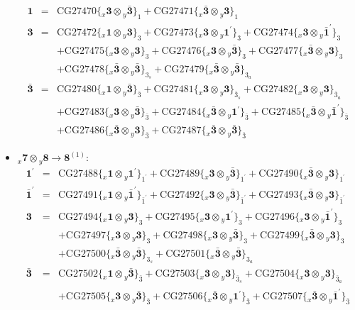 \documentclass[english]{article}
\newcommand{\rep}[1]{\mathbf{#1}}
\newcommand{\repx}[2]{{}_{#2}\mathbf{#1}}
\newcommand{\subcg}[3]{\big\{ \repx{#1}{x}\otimes\repx{#2}{y}\big\}^{}_{#3}}
\begin{document}
\begin{itemize}
\begin{eqnarray*}
\rep{1} &=& \text{CG27470}\subcg{3}{\bar{3}}{1}+\text{CG27471}\subcg{\bar{3}}{3}{1}
\\
\rep{3} &=& \text{CG27472}\subcg{1}{3}{3}+\text{CG27473}\subcg{3}{1^{\prime}}{3}+\text{CG27474}\subcg{3}{\bar{1}^{\prime}}{3} \\ 
 & & +\text{CG27475}\subcg{3}{3}{3}+\text{CG27476}\subcg{3}{\bar{3}}{3}+\text{CG27477}\subcg{\bar{3}}{3}{3} \\ 
 & & +\text{CG27478}\subcg{\bar{3}}{\bar{3}}{3_{s}}+\text{CG27479}\subcg{\bar{3}}{\bar{3}}{3_{a}}
\\
\rep{\bar{3}} &=& \text{CG27480}\subcg{1}{\bar{3}}{\bar{3}}+\text{CG27481}\subcg{3}{3}{\bar{3}_{s}}+\text{CG27482}\subcg{3}{3}{\bar{3}_{a}} \\ 
 & & +\text{CG27483}\subcg{3}{\bar{3}}{\bar{3}}+\text{CG27484}\subcg{\bar{3}}{1^{\prime}}{\bar{3}}+\text{CG27485}\subcg{\bar{3}}{\bar{1}^{\prime}}{\bar{3}} \\ 
 & & +\text{CG27486}\subcg{\bar{3}}{3}{\bar{3}}+\text{CG27487}\subcg{\bar{3}}{\bar{3}}{\bar{3}}
\end{eqnarray*}
\item $\repx{7}{x}\otimes\repx{8}{y}\to\rep{8}^{(1)}$:
\begin{eqnarray*}
\rep{1^{\prime}} &=& \text{CG27488}\subcg{1}{1^{\prime}}{1^{\prime}}+\text{CG27489}\subcg{3}{\bar{3}}{1^{\prime}}+\text{CG27490}\subcg{\bar{3}}{3}{1^{\prime}}
\\
\rep{\bar{1}^{\prime}} &=& \text{CG27491}\subcg{1}{\bar{1}^{\prime}}{\bar{1}^{\prime}}+\text{CG27492}\subcg{3}{\bar{3}}{\bar{1}^{\prime}}+\text{CG27493}\subcg{\bar{3}}{3}{\bar{1}^{\prime}}
\\
\rep{3} &=& \text{CG27494}\subcg{1}{3}{3}+\text{CG27495}\subcg{3}{1^{\prime}}{3}+\text{CG27496}\subcg{3}{\bar{1}^{\prime}}{3} \\ 
 & & +\text{CG27497}\subcg{3}{3}{3}+\text{CG27498}\subcg{3}{\bar{3}}{3}+\text{CG27499}\subcg{\bar{3}}{3}{3} \\ 
 & & +\text{CG27500}\subcg{\bar{3}}{\bar{3}}{3_{s}}+\text{CG27501}\subcg{\bar{3}}{\bar{3}}{3_{a}}
\\
\rep{\bar{3}} &=& \text{CG27502}\subcg{1}{\bar{3}}{\bar{3}}+\text{CG27503}\subcg{3}{3}{\bar{3}_{s}}+\text{CG27504}\subcg{3}{3}{\bar{3}_{a}} \\ 
 & & +\text{CG27505}\subcg{3}{\bar{3}}{\bar{3}}+\text{CG27506}\subcg{\bar{3}}{1^{\prime}}{\bar{3}}+\text{CG27507}\subcg{\bar{3}}{\bar{1}^{\prime}}{\bar{3}} \\ 

\end{eqnarray*}
\end{itemize}
\end{document}
